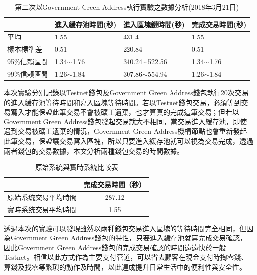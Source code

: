 			\begin{table}[!htbp]
				\centering
				\caption{第二次以Government Green Address執行實驗之數據分析(2018年3月21日)}
				\label{2green-1}
				\begin{tabular}{|l|l|l|l|}
				\hline
				 & 進入緩存池時間(秒) & 進入區塊鏈時間(秒) & 完成交易時間(秒) \\ \hline
				平均 & 1.55 & 431.4 & 1.55 \\ \hline
				樣本標準差 & 0.51 & 220.84 & 0.51 \\ \hline
				95\%信賴區間 & 1.34$\sim$1.76 & 340.24$\sim$522.56 & 1.34$\sim$1.76 \\ \hline
				99\%信賴區間 & 1.26$\sim$1.84 & 307.86$\sim$554.94 & 1.26$\sim$1.84 \\ \hline
				\end{tabular}
				\end{table}

				

				
				



	本次實驗分別記錄以Testnet錢包及Government Green Address錢包執行20次交易的進入緩存池等待時間和寫入區塊等待時間。若以Testnet錢包交易，必須等到交易寫入才能保證此筆交易不會被礦工遺棄，也才算真的完成這筆交易；但若以Government Green Address錢包發起交易就大不相同，當交易進入緩存池，即使遇到交易被礦工遺棄的情況，Government Green Address機構節點也會重新發起此筆交易，保證讓交易寫入區塊，所以只要進入緩存池就可以視為交易完成，透過兩者錢包的交易數據，本文分析兩種錢包交易的時間數據。

	\begin{table}[!htbp]
	\centering
	\caption{原始系統與實時系統比較表}
	\label{generalvsga}
	\begin{tabular}{|c|c|}
	\hline
	 & 完成交易時間（秒） \\ \hline
	原始系统交易平均時間 & 287.12 \\ \hline
	實時系统交易平均時間 & 1.55 \\ \hline
	\end{tabular}
	\end{table}

	透過本次的實驗可以發現雖然以兩種錢包交易進入區塊的等待時間完全相同，但因為Government Green Address錢包的特性，只要進入緩存池就算完成交易確認，因此Government Green Address錢包的完成交易確認的時間遠遠快於一般Testnet。相信以此⽅式作為主要⽀付管道，可以省去顧客在現金⽀付時掏零錢、算錢及找零等繁瑣的動作及時間，以此達成提升⽇常⽣活中的便利性與安全性。



		